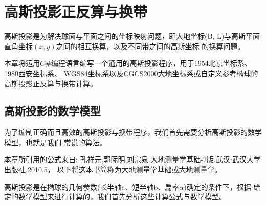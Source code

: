 
\chapter{高斯投影正反算与换带}

高斯投影是为解决球面与平面之间的坐标映射问题，即大地坐标(B,
L)与高斯平面直角坐标$(x,y)$之间的相互换算，以及不同带之间的高斯坐标
的换算问题。

本章将运用$C\#$编程语言编写一个通用的高斯投影程序，用于1954北京坐标系、1980西安坐标系、
WGS84坐标系以及CGCS2000大地坐标系或自定义参考椭球的高斯投影正反算与换带计算。


\section{高斯投影的数学模型}

为了编制正确而且高效的高斯投影与换带程序，我们首先需要分析高斯投影的数学模型，也就是我们
常说的算法。

本章所引用的公式来自:
孔祥元,郭际明,刘宗泉.大地测量学基础-2版.武汉:武汉大学出版社,2010.5，
以下将这本书简称为大地测量学基础或大地测量学。

高斯投影是在椭球的几何参数(长半轴a、短半轴b、扁率$\alpha$)确定的条件下，根据
给定的数学模型来进行计算的，我们首先分析这些计算公式与数学模型。

